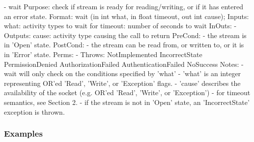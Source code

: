 \begin{myspec}
 
    - wait
      Purpose:  check if stream is ready for reading/writing, or 
                if it has entered an error state.
      Format:   wait                 (in  int      what,
                                      in  float    timeout,
                                      out int      cause);
      Inputs:   what:                 activity types to wait for
                timeout:              number of seconds to wait
      InOuts:   -
      Outputs:  cause:                activity type causing the
                                      call to return
      PreCond:  - the stream is in 'Open' state.
      PostCond: - the stream can be read from, or written to, or
                  it is in 'Error' state.
      Perms:    -
      Throws:   NotImplemented
                IncorrectState
                PermissionDenied
                AuthorizationFailed
                AuthenticationFailed
                NoSuccess
      Notes:    - wait will only check on the conditions 
                  specified by 'what'
                - 'what' is an integer representing 
                   OR'ed 'Read', 'Write', or 'Exception' flags.
                - 'cause' describes the availability of the 
                  socket (e.g. OR'ed 'Read', 'Write', or 
                  'Exception')
                - for timeout semantics, see Section 2.
                - if the stream is not in 'Open' state, an
                  'IncorrectState' exception is thrown.
 \end{myspec}
 
 
 \subsubsection{Examples}
 
